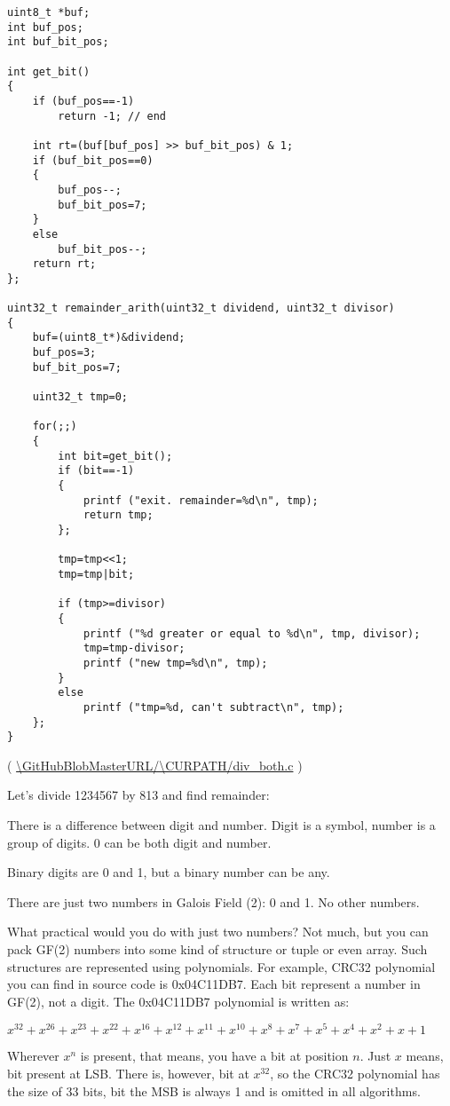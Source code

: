 \begin{lstlisting}[style=customc]
uint8_t *buf;
int buf_pos;
int buf_bit_pos;

int get_bit()
{
	if (buf_pos==-1)
		return -1; // end

	int rt=(buf[buf_pos] >> buf_bit_pos) & 1;
	if (buf_bit_pos==0)
	{
		buf_pos--;
		buf_bit_pos=7;
	}
	else
		buf_bit_pos--;
	return rt;
};

uint32_t remainder_arith(uint32_t dividend, uint32_t divisor)
{
	buf=(uint8_t*)&dividend;
	buf_pos=3;
	buf_bit_pos=7;

	uint32_t tmp=0;

	for(;;)
	{
		int bit=get_bit();
		if (bit==-1)
		{
			printf ("exit. remainder=%d\n", tmp);
			return tmp;
		};

		tmp=tmp<<1;
		tmp=tmp|bit;

		if (tmp>=divisor)
		{
			printf ("%d greater or equal to %d\n", tmp, divisor);
			tmp=tmp-divisor;
			printf ("new tmp=%d\n", tmp);
		}
		else
			printf ("tmp=%d, can't subtract\n", tmp);
	};
}
\end{lstlisting}

( \url{\GitHubBlobMasterURL/\CURPATH/div_both.c} )

Let's divide 1234567 by 813 and find remainder:




There is a difference between digit and number.
Digit is a symbol, number is a group of digits.
0 can be both digit and number.

Binary digits are 0 and 1, but a binary number can be any.

There are just two numbers in Galois Field (2): 0 and 1.
No other numbers.

What practical would you do with just two numbers?
Not much, but you can pack GF(2) numbers into some kind of structure or tuple or even array.
Such structures are represented using polynomials.
For example, CRC32 polynomial you can find in source code is 0x04C11DB7.
Each bit represent a number in GF(2), not a digit.
The 0x04C11DB7 polynomial is written as: 

$x^{32} + x^{26} + x^{23} + x^{22} + x^{16} + x^{12} + x^{11} + x^{10} + x^8 + x^7 + x^5 + x^4 + x^2 + x + 1$

Wherever $x^n$ is present, that means, you have a bit at position $n$.
Just $x$ means, bit present at LSB.
There is, however, bit at $x^{32}$, so the CRC32 polynomial has the size of 33 bits, bit the \ac{MSB} is always 1 and is
omitted in all algorithms.

